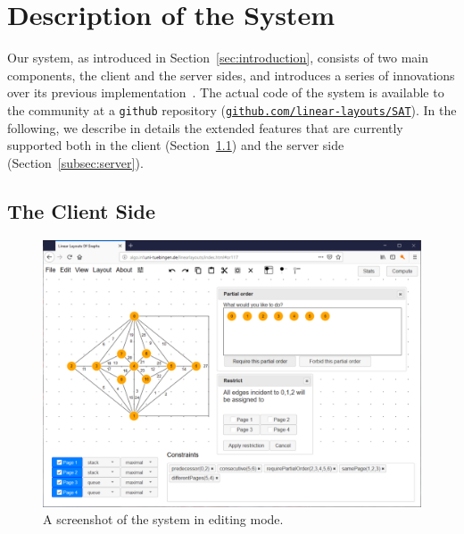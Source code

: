 \documentclass[runningheads]{llncs}
\newcommand\rurl[1]{\href{http://#1}{\nolinkurl{#1}}}
\begin{document}
 
\section{Description of the System}
\label{sec:system}

Our system, as introduced in Section~\ref{sec:introduction}, consists of two main components, the client and the server sides, and introduces a series of innovations over its previous implementation~\cite{bob}. The actual code of the system is available to the community at a \texttt{github} repository (\rurl{github.com/linear-layouts/SAT}).
%
%
In the following, we describe in details the extended features that are currently supported both in the client (Section~\ref{subsec:client}) and the server side (Section~\ref{subsec:server}). 

\subsection{The Client Side}
\label{subsec:client}

\begin{figure}[t]
	\centering
	\includegraphics[width=\textwidth]{editingmode}
	\caption{A screenshot of the system in editing mode.}
	\label{fig:editingmode}
\end{figure}
\end{document}
